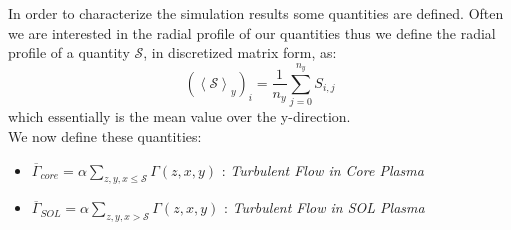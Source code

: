 \documentclass[master.tex]{subfiles}
\begin{document}
In order to characterize the simulation results some quantities are defined. Often we are interested in the radial profile of our quantities thus we define the radial profile of a quantity $\mathcal{S}$, in discretized matrix form, as:
\begin{equation}
    (\left<\mathcal{S}\right>_y)_i = \frac{1}{n_y} \sum_{j=0}^{n_y} S_{i, j}
\end{equation}
which essentially is the mean value over the y-direction.\\
We now define these quantities:

\begin{itemize}
    \item $\overline{\Gamma}_{core} = \alpha \sum_{z, y, x \leq \mathcal{S}} \Gamma(z,x,y)$ : \textit{Turbulent Flow in Core Plasma}
    \item $\overline{\Gamma}_{SOL} = \alpha \sum_{z, y, x > \mathcal{S}} \Gamma(z,x,y)$ : \textit{Turbulent Flow in \ac{SOL} Plasma}
\end{itemize}
\end{document}
